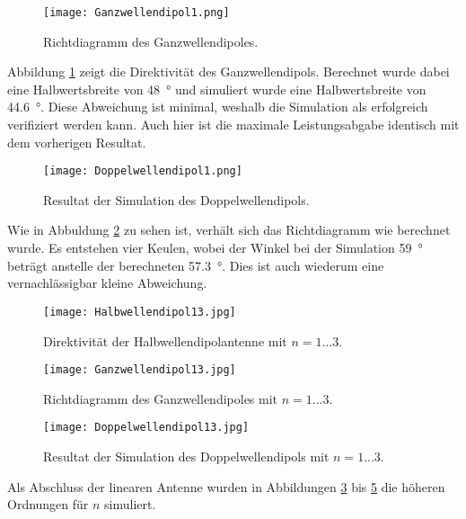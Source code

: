 \begin{figure}[!ht]
	\centering
    \texttt{[image: Ganzwellendipol1.png]}
    \caption{Richtdiagramm des Ganzwellendipoles.}
    \label{fig:Ganzwellendipol1}
\end{figure}

Abbildung \ref{fig:Ganzwellendipol1} zeigt die Direktivität des Ganzwellendipols. Berechnet wurde dabei eine Halbwertsbreite von \SI{48}{\degree} und simuliert wurde eine Halbwertsbreite von \SI{44.6}{\degree}. Diese Abweichung ist minimal, weshalb die Simulation als erfolgreich verifiziert werden kann. Auch hier ist die maximale Leistungsabgabe identisch mit dem vorherigen Resultat.

\begin{figure}[!ht]
	\centering
    \texttt{[image: Doppelwellendipol1.png]}
    \caption{Resultat der Simulation des Doppelwellendipols.}
    \label{fig:Doppelwellendipol1}
\end{figure}

Wie in Abbuldung \ref{fig:Doppelwellendipol1} zu sehen ist, verhält sich das Richtdiagramm wie berechnet wurde. Es entstehen vier Keulen, wobei der Winkel bei der Simulation \SI{59}{\degree} beträgt anstelle der berechneten \SI{57.3}{\degree}. Dies ist auch wiederum eine vernachlässigbar kleine Abweichung.

\begin{figure}[!ht]
	\centering
    \texttt{[image: Halbwellendipol13.jpg]}
    \caption{Direktivität der Halbwellendipolantenne mit $n = 1 ... 3$.}
    \label{fig:Halbwellendipol13}
\end{figure}

\begin{figure}[!ht]
	\centering
    \texttt{[image: Ganzwellendipol13.jpg]}
    \caption{Richtdiagramm des Ganzwellendipoles mit $n = 1 ... 3$.}
    \label{fig:Ganzwellendipol13}
\end{figure}

\begin{figure}[!ht]
	\centering
    \texttt{[image: Doppelwellendipol13.jpg]}
    \caption{Resultat der Simulation des Doppelwellendipols mit $n = 1 ... 3$.}
    \label{fig:Doppelwellendipol13}
\end{figure}

Als Abschluss der linearen Antenne wurden in Abbildungen \ref{fig:Halbwellendipol13} bis \ref{fig:Doppelwellendipol13} die höheren Ordnungen für $n$ simuliert. 

